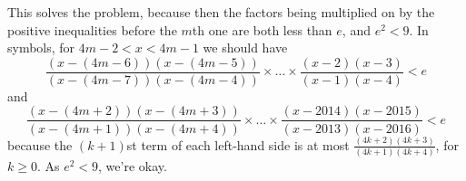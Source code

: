 This solves the problem, because then the factors being multiplied
on by the positive inequalities before the
$m$th one are both less than $e$, and $e^2 < 9$.
In symbols, for $4m-2 < x < 4m-1$ we should have
\[ \frac{(x-(4m-6))(x-(4m-5))}{(x-(4m-7))(x-(4m-4))}
  \times \dots \times \frac{(x-2)(x-3)}{(x-1)(x-4)} < e \]
and
\[ \frac{(x-(4m+2))(x-(4m+3))}{(x-(4m+1))(x-(4m+4))}
  \times \dots \times \frac{(x-2014)(x-2015)}{(x-2013)(x-2016)} < e \]
because the $(k+1)$st term of each left-hand side
is at most $\frac{(4k+2)(4k+3)}{(4k+1)(4k+4)}$, for $k \ge 0$.
As $e^2 < 9$, we're okay.
\pagebreak